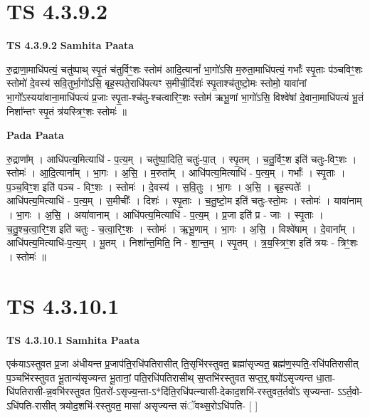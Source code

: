 \documentclass[17pt]{extarticle}
\begin{document}
\section*{ TS 4.3.9.2 }

\textbf{TS 4.3.9.2 } \newline
\textbf{Samhita Paata} \newline

रु॒द्राणा॒माधि॑पत्यं॒ चतु॑ष्पाथ् स्पृ॒तं च॑तुर्विꣳ॒॒शः स्तोम॑ आदि॒त्यानां᳚ भा॒गो॑ऽसि म॒रुता॒माधि॑पत्यं॒ गर्भाः᳚ स्पृ॒ताः प॑ञ्चविꣳ॒॒शः स्तोमो॑ दे॒वस्य॑ सवि॒तुर्भा॒गो॑ऽसि॒ बृह॒स्पते॒राधि॑पत्यꣳ स॒मीची॒र्दिशः॑ स्पृ॒ताश्च॑तुष्टो॒मः स्तोमो॒ यावा॑नां भा॒गो᳚ऽस्यया॑वाना॒माधि॑पत्यं प्र॒जाः स्पृ॒ता-श्च॑तु-श्चत्वारिꣳ॒॒शः स्तोम॑ ऋभू॒णां भा॒गो॑ऽसि॒ विश्वे॑षां दे॒वाना॒माधि॑पत्यं भू॒तं निशा᳚न्तꣳ स्पृ॒तं त्र॑यस्त्रिꣳ॒॒शः स्तोमः॑ ॥ \newline

\textbf{Pada Paata} \newline

रु॒द्राणा᳚म् । आधि॑पत्य॒मित्याधि॑ - प॒त्य॒म् । चतु॑ष्पा॒दिति॒ चतुः॑-पा॒त् । स्पृ॒तम् । च॒तु॒र्विꣳ॒॒श इति॑ चतुः-विꣳ॒॒शः । स्तोमः॑ । आ॒दि॒त्याना᳚म् । भा॒गः । अ॒सि॒ । म॒रुता᳚म् । आधि॑पत्य॒मित्याधि॑ - प॒त्य॒म् । गर्भाः᳚ । स्पृ॒ताः । प॒ञ्च॒विꣳ॒॒श इति॑ पञ्च - विꣳ॒॒शः । स्तोमः॑ । दे॒वस्य॑ । स॒वि॒तुः । भा॒गः । अ॒सि॒ । बृह॒स्पतेः᳚ । आधि॑पत्य॒मित्याधि॑ - प॒त्य॒म् । स॒मीचीः᳚ । दिशः॑ । स्पृ॒ताः । च॒तु॒ष्टो॒म इति॑ चतुः-स्तो॒मः । स्तोमः॑ । यावा॑नाम् । भा॒गः । अ॒सि॒ । अया॑वानाम् । आधि॑पत्य॒मित्याधि॑ - प॒त्य॒म् । प्र॒जा इति॑ प्र - जाः । स्पृ॒ताः । च॒तु॒श्च॒त्वा॒रिꣳ॒॒श इति॑ चतुः - च॒त्वा॒रिꣳ॒॒शः । स्तोमः॑ । ऋ॒भू॒णाम् । भा॒गः । अ॒सि॒ । विश्वे॑षाम् । दे॒वाना᳚म् । आधि॑पत्य॒मित्याधि॑-प॒त्य॒म् । भू॒तम् । निशा᳚न्त॒मिति॒ नि - शा॒न्त॒म् । स्पृ॒तम् । त्र॒य॒स्त्रिꣳ॒॒श इति॑ त्रयः - त्रिꣳ॒॒शः । स्तोमः॑ ॥  \newline




\section*{ TS 4.3.10.1 }

\textbf{TS 4.3.10.1 } \newline
\textbf{Samhita Paata} \newline

एक॑याऽस्तुवत प्र॒जा अ॑धीयन्त प्र॒जाप॑ति॒रधि॑पतिरासीत् ति॒सृभि॑रस्तुवत॒ ब्रह्मा॑सृज्यत॒ ब्रह्म॑ण॒स्पति॒-रधि॑पतिरासीत् प॒ञ्चभि॑रस्तुवत भू॒तान्य॑सृज्यन्त भू॒तानां॒ पति॒रधि॑पतिरासीथ् स॒प्तभि॑रस्तुवत सप्त॒र्॒.षयो॑ऽसृज्यन्त धा॒ता-धि॑पतिरासी-न्न॒वभि॑रस्तुवत पि॒तरो॑-ऽसृज्य॒न्ता-ऽ*दि॑ति॒रधि॑पत्न्यासी-देकाद॒शभि॑-रस्तुवत॒र्तवो॑ऽ सृज्यन्ता- ऽऽर्त॒वो-ऽधि॑पति-रासीत् त्रयोद॒शभि॑-रस्तुवत॒ मासा॑ असृज्यन्त संॅवथ्स॒रोऽधि॑पति- [  ] \newline
\end{document}

